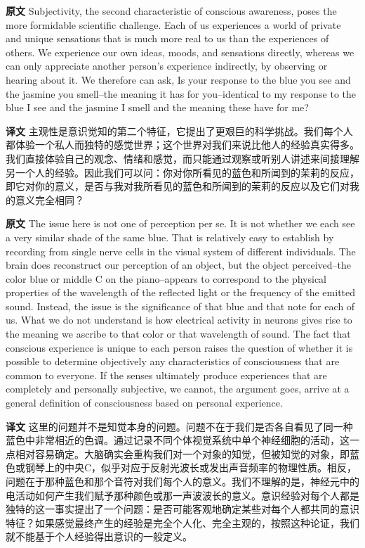 \documentclass[UTF8]{ctexart}
\newenvironment{english}{\par\small\noindent\textbf{原文}\quad\ignorespaces}{\par}
\newenvironment{zhtranslation}{\par\noindent\textbf{译文}\quad\ignorespaces}{\par\vspace{0.35em}}
\begin{document}
\begin{english}
Subjectivity, the second characteristic of conscious awareness, poses the more formidable scientific challenge. Each of us experiences a world of private and unique sensations that is much more real to us than the experiences of others. We experience our own ideas, moods, and sensations directly, whereas we can only appreciate another person's experience indirectly, by observing or hearing about it. We therefore can ask, Is your response to the blue you see and the jasmine you smell--the meaning it has for you--identical to my response to the blue I see and the jasmine I smell and the meaning these have for me?
\end{english}
\begin{zhtranslation}
主观性是意识觉知的第二个特征，它提出了更艰巨的科学挑战。我们每个人都体验一个私人而独特的感觉世界；这个世界对我们来说比他人的经验真实得多。我们直接体验自己的观念、情绪和感觉，而只能通过观察或听别人讲述来间接理解另一个人的经验。因此我们可以问：你对你所看见的蓝色和所闻到的茉莉的反应，即它对你的意义，是否与我对我所看见的蓝色和所闻到的茉莉的反应以及它们对我的意义完全相同？
\end{zhtranslation}

\begin{english}
The issue here is not one of perception per se. It is not whether we each see a very similar shade of the same blue. That is relatively easy to establish by recording from single nerve cells in the visual system of different individuals. The brain does reconstruct our perception of an object, but the object perceived--the color blue or middle C on the piano--appears to correspond to the physical properties of the wavelength of the reflected light or the frequency of the emitted sound. Instead, the issue is the significance of that blue and that note for each of us. What we do not understand is how electrical activity in neurons gives rise to the meaning we ascribe to that color or that wavelength of sound. The fact that conscious experience is unique to each person raises the question of whether it is possible to determine objectively any characteristics of consciousness that are common to everyone. If the senses ultimately produce experiences that are completely and personally subjective, we cannot, the argument goes, arrive at a general definition of consciousness based on personal experience.
\end{english}
\begin{zhtranslation}
这里的问题并不是知觉本身的问题。问题不在于我们是否各自看见了同一种蓝色中非常相近的色调。通过记录不同个体视觉系统中单个神经细胞的活动，这一点相对容易确定。大脑确实会重构我们对一个对象的知觉，但被知觉的对象，即蓝色或钢琴上的中央C，似乎对应于反射光波长或发出声音频率的物理性质。相反，问题在于那种蓝色和那个音符对我们每个人的意义。我们不理解的是，神经元中的电活动如何产生我们赋予那种颜色或那一声波波长的意义。意识经验对每个人都是独特的这一事实提出了一个问题：是否可能客观地确定某些对每个人都共同的意识特征？如果感觉最终产生的经验是完全个人化、完全主观的，按照这种论证，我们就不能基于个人经验得出意识的一般定义。\end{zhtranslation}
\end{document}
